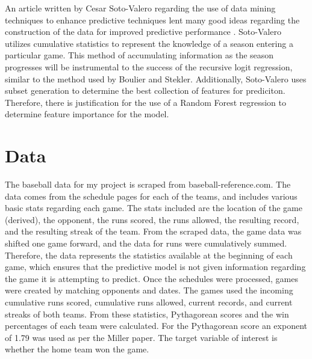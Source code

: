 \documentclass{article}
\begin{document}
An article written by Cesar Soto-Valero regarding the use of data
mining techniques to enhance predictive techniques lent many good ideas 
regarding the construction of the data for improved predictive performance
\cite{Cesar}.
Soto-Valero utilizes cumulative statistics to represent the knowledge of 
a season entering a particular game.
This method of accumulating information as the season progresses will be
instrumental to the success of the recursive logit regression,
similar to the method used by Boulier and Stekler.
Additionally,
Soto-Valero uses subset generation to determine the best collection of features
for prediciton.
Therefore,
there is justification for the use of a Random Forest regression to determine
feature importance for the model.


\section{Data}
The baseball data for my project is scraped from baseball-reference.com.
The data comes from the schedule pages for each of the teams,
and includes various basic stats regarding each game.
The stats included are the location of the game (derived), the opponent,
the runs scored, the runs allowed, the resulting record, and the resulting
streak of the team.
From the scraped data,
the game data was shifted one game forward,
and the data for runs were cumulatively summed.
Therefore,
the data represents the statistics available at the beginning of each game,
which ensures that the predictive model is not given information regarding
the game it is attempting to predict.
Once the schedules were processed,
games were created by matching opponents and dates.
The games used the incoming cumulative runs scored,
cumulative runs allowed,
current records,
and current streaks of both teams.
From these statistics,
Pythagorean scores and the win percentages of each team were calculated.
For the Pythagorean score an exponent of 1.79 was used as per the Miller paper.
The target variable of interest is whether the home team won the game.\par
\end{document}
